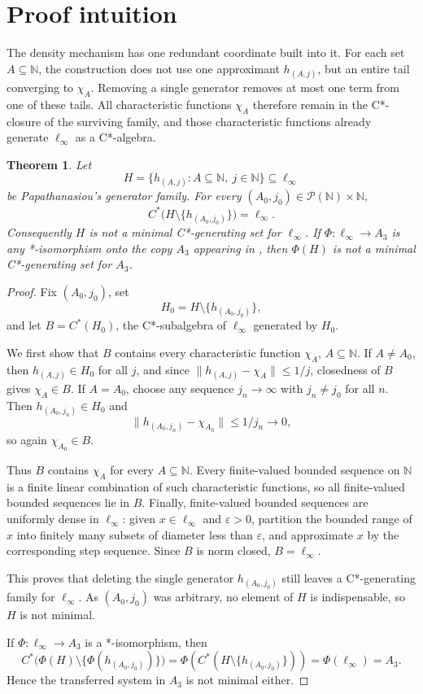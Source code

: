 \documentclass[11pt]{article}
\newtheorem{theorem}{Theorem}
\newcommand{\N}{\mathbb{N}}
\newcommand{\linf}{\ell_\infty}
\begin{document}
\section*{Proof intuition}

The density mechanism has one redundant coordinate built into it.  For each
set \(A\subseteq \N\), the construction does not use one approximant
\(h_{(A,j)}\), but an entire tail converging to \(\chi_A\).  Removing a
single generator removes at most one term from one of these tails.  All
characteristic functions \(\chi_A\) therefore remain in the C*-closure of the
surviving family, and those characteristic functions already generate
\(\ell_\infty\) as a C*-algebra.

\begin{theorem}
Let
\[
        H=\{h_{(A,j)}: A\subseteq \N,\ j\in\N\}\subseteq \linf
\]
be Papathanasiou's generator family.  For every
\((A_0,j_0)\in \mathcal P(\N)\times\N\),
\[
        C^*\bigl(H\setminus\{h_{(A_0,j_0)}\}\bigr)=\linf .
\]
Consequently \(H\) is not a minimal C*-generating set for \(\linf\).  If
\(\Phi:\linf\to A_3\) is any *-isomorphism onto the copy \(A_3\) appearing in
\cite{FrancaGarces}, then \(\Phi(H)\) is not a minimal C*-generating set for
\(A_3\).
\end{theorem}

\begin{proof}
Fix \((A_0,j_0)\), set
\[
        H_0=H\setminus\{h_{(A_0,j_0)}\},
\]
and let \(B=C^*(H_0)\), the C*-subalgebra of \(\linf\) generated by \(H_0\).

We first show that \(B\) contains every characteristic function \(\chi_A\),
\(A\subseteq\N\).  If \(A\neq A_0\), then \(h_{(A,j)}\in H_0\) for all
\(j\), and since \(\|h_{(A,j)}-\chi_A\|\leq 1/j\), closedness of \(B\) gives
\(\chi_A\in B\).  If \(A=A_0\), choose any sequence \(j_n\to\infty\) with
\(j_n\neq j_0\) for all \(n\).  Then \(h_{(A_0,j_n)}\in H_0\) and
\[
        \|h_{(A_0,j_n)}-\chi_{A_0}\|\leq 1/j_n\to 0,
\]
so again \(\chi_{A_0}\in B\).

Thus \(B\) contains \(\chi_A\) for every \(A\subseteq\N\).  Every finite-valued
bounded sequence on \(\N\) is a finite linear combination of such
characteristic functions, so all finite-valued bounded sequences lie in
\(B\).  Finally, finite-valued bounded sequences are uniformly dense in
\(\ell_\infty\): given \(x\in\ell_\infty\) and \(\varepsilon>0\), partition
the bounded range of \(x\) into finitely many subsets of diameter less than
\(\varepsilon\), and approximate \(x\) by the corresponding step sequence.
Since \(B\) is norm closed, \(B=\ell_\infty\).

This proves that deleting the single generator \(h_{(A_0,j_0)}\) still leaves
a C*-generating family for \(\ell_\infty\).  As \((A_0,j_0)\) was arbitrary,
no element of \(H\) is indispensable, so \(H\) is not minimal.

If \(\Phi:\ell_\infty\to A_3\) is a *-isomorphism, then
\[
 C^*\bigl(\Phi(H)\setminus\{\Phi(h_{(A_0,j_0)})\}\bigr)
 =\Phi\!\left(C^*(H\setminus\{h_{(A_0,j_0)}\})\right)
 =\Phi(\ell_\infty)=A_3.
\]
Hence the transferred system in \(A_3\) is not minimal either.
\end{proof}
\end{document}
